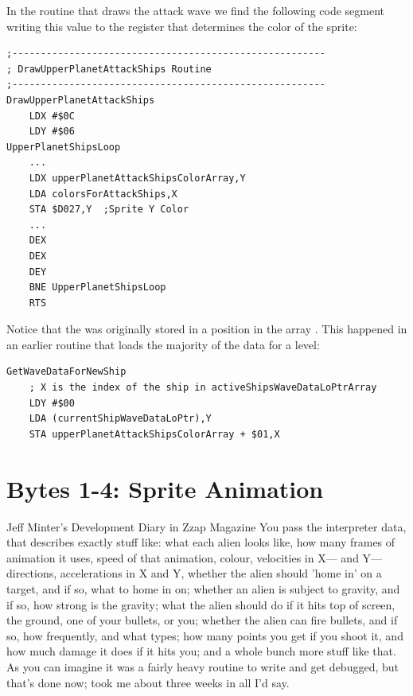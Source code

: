 In the routine that draws the attack wave we find the following code segment writing this value
to the register  that determines the color of the sprite:

\begin{lstlisting}
;-------------------------------------------------------
; DrawUpperPlanetAttackShips Routine
;-------------------------------------------------------
DrawUpperPlanetAttackShips
    LDX #$0C
    LDY #$06
UpperPlanetShipsLoop   
    ...
    LDX upperPlanetAttackShipsColorArray,Y
    LDA colorsForAttackShips,X
    STA $D027,Y  ;Sprite Y Color
    ...
    DEX
    DEX
    DEY
    BNE UpperPlanetShipsLoop
    RTS
\end{lstlisting}

Notice that the  was originally stored in a position in the array .
This happened in an earlier routine that loads the majority of the data for a level:


\begin{lstlisting}
GetWaveDataForNewShip
    ; X is the index of the ship in activeShipsWaveDataLoPtrArray
    LDY #$00
    LDA (currentShipWaveDataLoPtr),Y
    STA upperPlanetAttackShipsColorArray + $01,X
\end{lstlisting}

\section{Bytes 1-4: Sprite Animation}
\begin{q}{Jeff Minter's Development Diary in Zzap Magazine\cite{planner}}
You pass the interpreter data, that describes exactly stuff like: what each
alien looks like, how many frames of animation it uses, speed of that
animation, colour, velocities in X— and Y— directions, accelerations in X and
Y, whether the alien should 'home in' on a target, and if so, what to home in
on; whether an alien is subject to gravity, and if so, how strong is the
gravity; what the alien should do if it hits top of screen, the ground, one of
your bullets, or you; whether the alien can fire bullets, and if so, how
frequently, and what types; how many points you get if you shoot it, and how
much damage it does if it hits you; and a whole bunch more stuff like that. As
you can imagine it was a fairly heavy routine to write and get debugged, but
that's done now; took me about three weeks in all I'd say.
\end{q}

